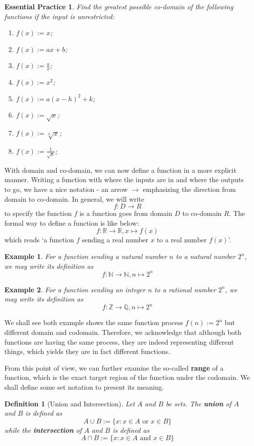 \documentclass[12pt]{article}
\newtheorem{definition}{Definition}[section]
\newtheorem*{example}{Example}
\newtheorem{exercise}{Essential Practice}[subsection]
\begin{document}
    \begin{exercise}
        Find the greatest possible co-domain of the following functions if the input is unrestricted:\begin{enumerate}
            \item $f(x):=x$;
            \item $f(x):=ax+b$;
            \item $f(x):=\frac{a}{x}$;
            \item $f(x):=x^2$;
            \item $f(x):=a(x-h)^2+k$;
            \item $f(x):=\sqrt{x}$;
            \item $f(x):=\sqrt[3]{x}$;
            \item $f(x):=\frac{1}{\sqrt{x}}$;
        \end{enumerate}
    \end{exercise}

    With domain and co-domain, we can now define a function in a more explicit manner. Writing a function with where the inputs are in and where the outputs to go, we have a nice notation - an arrow $\to$ emphasizing the direction from domain to co-domain. In general, we will write $$f:D\to R$$ to specify the function $f$ is a function goes from domain $D$ to co-domain $R$. The formal way to define a function is like below: $$f:\mathbb{R}\to\mathbb{R}, x\mapsto f(x)$$ which reads `a function $f$ sending a real number $x$ to a real number $f(x)$'.

    \begin{example}
        For a function sending a natural number $n$ to a natural number $2^n$, we may write its definition as $$f:\mathbb{N}\to \mathbb{N}, n\mapsto 2^n$$
    \end{example}

    \begin{example}
        For a function sending an integer $n$ to a rational number $2^n$, we may write its definition as $$f:\mathbb{Z}\to \mathbb{Q}, n\mapsto 2^n$$
    \end{example}

    We shall see both example shows the same function process $f(n):=2^n$ but different domain and codomain. Therefore, we acknowledge that although both functions are having the same process, they are indeed representing different things, which yields they are in fact different functions.

    From this point of view, we can further examine the so-called \textbf{range} of a function, which is the exact target region of the function under the codomain. We shall define some set notation to present its meaning.
    \begin{definition}[Union and Intersection]
        Let $A$ and $B$ be sets. The \textbf{union} of $A$ and $B$ is defined as $$A\cup B:= \{x:x\in A \textrm{ or } x\in B\}$$ while the \textbf{intersection} of $A$ and $B$ is defined as $$A\cap B:= \{x:x\in A \textrm{ and } x\in B\}$$
    \end{definition}
\end{document}
